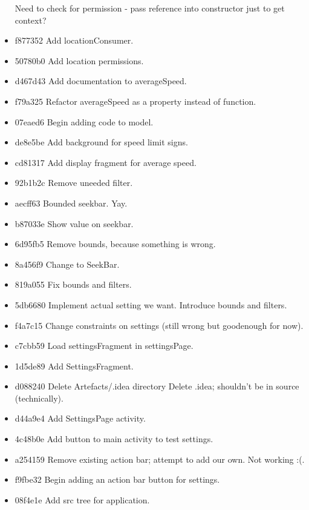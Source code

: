 \documentclass[11pt, a4paper, notitlepage]{report}
\begin{document}
\begin{itemize}
	Need to check for permission - pass reference into constructor just to get context?
	\item f877352 Add locationConsumer. 
	\item 50780b0 Add location permissions. 
	\item d467d43 Add documentation to averageSpeed. 
	\item f79a325 Refactor averageSpeed as a property instead of function. 
	\item 07eaed6 Begin adding code to model. 
	\item de8e5be Add background for speed limit signs. 
	\item cd81317 Add display fragment for average speed. 
	\item 92b1b2c Remove uneeded filter. 
	\item aecff63 Bounded seekbar. Yay. 
	\item b87033e Show value on seekbar. 
	\item 6d95fb5 Remove bounds, because something is wrong. 
	\item 8a456f9 Change to SeekBar. 
	\item 819a055 Fix bounds and filters. 
	\item 5db6680 Implement actual setting we want. Introduce bounds and filters. 
	\item f4a7c15 Change constraints on settings (still wrong but goodenough for now). 
	\item c7cbb59 Load settingsFragment in settingsPage. 
	\item 1d5de89 Add SettingsFragment. 
	\item d088240 Delete Artefacts/.idea directory Delete .idea; shouldn't be in source (technically).
	\item d44a9e4 Add SettingsPage activity. 
	\item 4c48b0e Add button to main activity to test settings. 
	\item a254159 Remove existing action bar; attempt to add our own. Not working :(. 
	\item f9fbe32 Begin adding an action bar button for settings. 
	\item 08f4e1e Add src tree for application.
\end{itemize}


\end{document}
